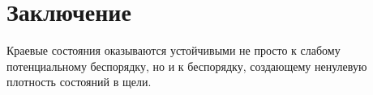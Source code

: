 \newpage
\section{Заключение}
Краевые состояния оказываются устойчивыми не просто к слабому потенциальному беспорядку, 
но и к беспорядку, создающему ненулевую плотность состояний в щели. 
